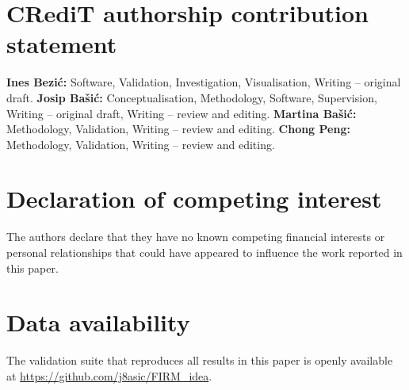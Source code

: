 \documentclass[preprint,review,12pt]{elsarticle}
\begin{document}
\section*{CRediT authorship contribution statement}
\textbf{Ines Bezić:} Software, Validation, Investigation, Visualisation, Writing -- original draft.
\textbf{Josip Bašić:} Conceptualisation, Methodology, Software, Supervision, Writing -- original draft, Writing -- review and editing.
\textbf{Martina Bašić:} Methodology, Validation, Writing -- review and editing.
\textbf{Chong Peng:} Methodology, Validation, Writing -- review and editing.

\section*{Declaration of competing interest}
The authors declare that they have no known competing financial interests or personal relationships that could have appeared to influence the work reported in this paper.

\section*{Data availability}
The validation suite that reproduces all results in this paper is openly available at \url{https://github.com/j8asic/FIRM_idea}.



\end{document}
